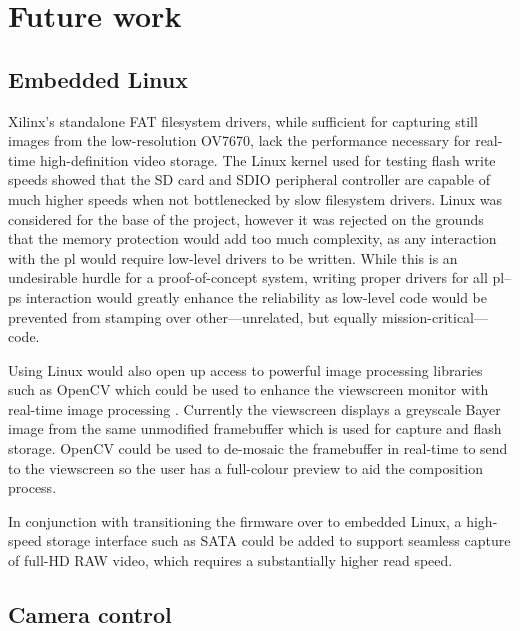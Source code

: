 \section{Future work}

\subsection{Embedded Linux}

Xilinx's standalone FAT filesystem drivers, while sufficient for capturing still images from the low-resolution OV7670, lack the performance necessary for real-time high-definition video storage. The Linux kernel used for testing flash write speeds showed that the SD card and SDIO peripheral controller are capable of much higher speeds when not bottlenecked by slow filesystem drivers. Linux was considered for the base of the project, however it was rejected on the grounds that the memory protection would add too much complexity, as any interaction with the \gls{pl} would require low-level drivers to be written. While this is an undesirable hurdle for a proof-of-concept system, writing proper drivers for all \gls{pl}--\gls{ps} interaction would greatly enhance the reliability as low-level code would be prevented from stamping over other---unrelated, but equally mission-critical---code.

Using Linux would also open up access to powerful image processing libraries such as OpenCV which could be used to enhance the viewscreen monitor with real-time image processing \cite{opencv}. Currently the viewscreen displays a greyscale Bayer image from the same unmodified framebuffer which is used for capture and flash storage. OpenCV could be used to de-mosaic the framebuffer in real-time to send to the viewscreen so the user has a full-colour preview to aid the composition process.

In conjunction with transitioning the firmware over to embedded Linux, a high-speed storage interface such as SATA could be added to support seamless capture of full-HD RAW video, which requires a substantially higher read speed. 

\subsection{Camera control}

